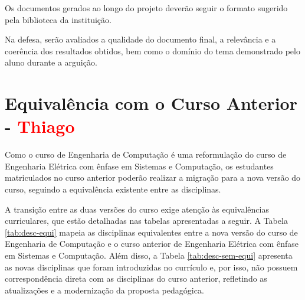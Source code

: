Os documentos gerados ao longo do projeto deverão seguir o formato sugerido pela biblioteca da instituição.

Na defesa, serão avaliados a qualidade do documento final, a relevância e a coerência dos resultados obtidos, bem como o domínio do tema demonstrado pelo aluno durante a arguição.



\section{Equivalência com o Curso Anterior - \textcolor{red}{Thiago}}


Como o curso de Engenharia de Computação é uma reformulação do curso de Engenharia Elétrica com ênfase em Sistemas e Computação, os estudantes matriculados no curso anterior poderão realizar a migração para a nova versão do curso, seguindo a equivalência existente entre as disciplinas.%

A transição entre as duas versões do curso exige atenção às equivalências curriculares, que estão detalhadas nas tabelas apresentadas a seguir. A Tabela \ref{tab:desc-equi} mapeia as disciplinas equivalentes entre a nova versão do curso de Engenharia de Computação e o curso anterior de Engenharia Elétrica com ênfase em Sistemas e Computação. Além disso, a Tabela \ref{tab:desc-sem-equi} apresenta as novas disciplinas que foram introduzidas no currículo e, por isso, não possuem correspondência direta com as disciplinas do curso anterior, refletindo as atualizações e a modernização da proposta pedagógica.

